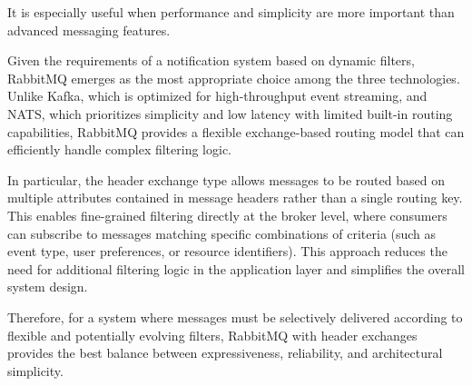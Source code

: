 It is especially useful when performance and simplicity are more important than advanced messaging features.

\bigskip

\noindent

Given the requirements of a notification system based on dynamic filters, RabbitMQ emerges as the most appropriate choice among the three technologies. Unlike Kafka, which is optimized for high-throughput event streaming, and NATS, which prioritizes simplicity and low latency with limited built-in routing capabilities, RabbitMQ provides a flexible exchange-based routing model that can efficiently handle complex filtering logic.

In particular, the header exchange type allows messages to be routed based on multiple attributes contained in message headers rather than a single routing key. This enables fine-grained filtering directly at the broker level, where consumers can subscribe to messages matching specific combinations of criteria (such as event type, user preferences, or resource identifiers). This approach reduces the need for additional filtering logic in the application layer and simplifies the overall system design.

Therefore, for a system where messages must be selectively delivered according to flexible and potentially evolving filters, RabbitMQ with header exchanges provides the best balance between expressiveness, reliability, and architectural simplicity.
